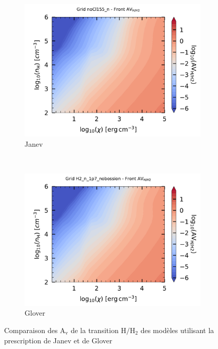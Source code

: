 \begin{figure}[!h]
    \centering
    \begin{subfigure}[t]{0.49\textwidth} %
        \centering \includegraphics[trim = {0 0 0 1cm },clip,width=1\textwidth]{figure/H2/grid_janev/HH2_AV.pdf}
        \caption{Janev}
    \end{subfigure}
    ~ 
    \begin{subfigure}[t]{0.49\textwidth}
        \centering \includegraphics[trim = {0 0 0 1cm },clip,width=1\textwidth]{figure/H2/grid_glover/HH2_AV.pdf}
        \caption{Glover}
    \end{subfigure}
    \caption{Comparaison des $\mathrm{A}_\mathrm{v}$ de la transition $\mathrm{H}/\mathrm{H}_2$ des modèles utilisant la prescription de Janev et de Glover}
    \label{fig:H2:JanevGlover:AVHH2}
\end{figure}
 
